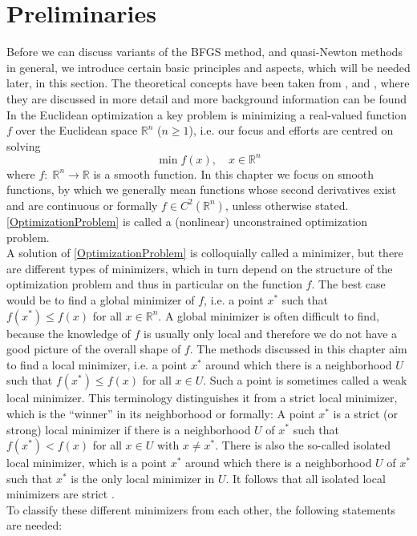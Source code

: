 \section{Preliminaries}
\label{Section2.1}

Before we can discuss variants of the BFGS method, and quasi-Newton methods in general, we introduce certain basic principles and aspects, which will be needed later, in this section. The theoretical concepts have been taken from \cite{GeigerKanzow:1999}, \cite{NocedalWright:2006} and \cite{SunYuan:2006}, where they are discussed in more detail and more background information can be found \\

In the Euclidean optimization a key problem is minimizing a real-valued function $f$ over the Euclidean space $\mathbb{R}^n$ ($n \geq 1$), i.e. our focus and efforts are centred on solving 
\begin{equation}\label{OptimizationProblem}
    \min f(x), \quad x \in \mathbb{R}^n
\end{equation}  
where $f \colon \; \mathbb{R}^n \to \mathbb{R}$ is a smooth function. In this chapter we focus on smooth functions, by which we generally mean functions whose second derivatives exist and are continuous or formally $f \in C^2(\mathbb{R}^n)$, unless otherwise stated. \cref{OptimizationProblem} is called a (nonlinear) unconstrained optimization problem. \\
A solution of \cref{OptimizationProblem} is colloquially called a minimizer, but there are different types of minimizers, which in turn depend on the structure of the optimization problem and thus in particular on the function $f$. The best case would be to find a global minimizer of $f$, i.e. a point $x^*$ such that $f(x^*) \leq f(x)$ for all $x \in \mathbb{R}^n$. A global minimizer is often difficult to find, because the knowledge of $f$ is usually only local and therefore we do not have a good picture of the overall shape of $f$. The methods discussed in this chapter aim to find a local minimizer, i.e. a point $x^*$ around which there is a neighborhood $U$ such that $f(x^*) \leq f(x)$ for all $x \in U$. Such a point is sometimes called a weak local minimizer. This terminology distinguishes it from a strict local minimizer, which is the “winner” in its neighborhood or formally: A point $x^*$ is a strict (or strong) local minimizer if there is a neighborhood $U$ of $x^*$ such that $f(x^*) < f(x)$ for all $x \in U$ with $x \neq x^*$. There is also the so-called isolated local minimizer, which is a point $x^*$ around which there is a neighborhood $U$ of $x^*$ such that $x^*$ is the only local minimizer in $U$. It follows that all isolated local minimizers are strict \cite[p.~12-13]{NocedalWright:2006}. \\
To classify these different minimizers from each other, the following statements are needed: 

